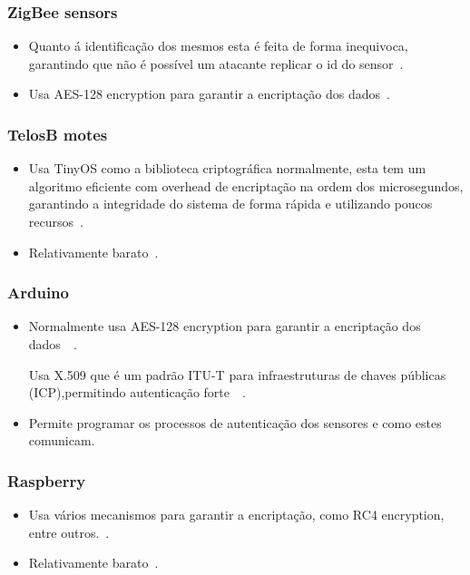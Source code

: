 \subsubsection{ZigBee sensors}
\begin{itemize}
\item Quanto á identificação dos mesmos esta é feita de forma inequivoca, garantindo que não é possível um atacante replicar o id do sensor~\cite{ref_url1}.\newline 
\item Usa AES-128 encryption para garantir a encriptação dos dados~\cite{ref_url1}.
\end{itemize}
\subsubsection{TelosB motes}
\begin{itemize}
\item Usa TinyOS como a biblioteca criptográfica normalmente, esta tem um algoritmo eficiente com overhead de encriptação na ordem dos microsegundos, garantindo a integridade do sistema de forma rápida e utilizando poucos recursos~\cite{ref_url2}.\newline
\item Relativamente barato~\cite{ref_url2}.
\end{itemize}
\subsubsection{Arduino}
\begin{itemize}
\item Normalmente usa AES-128 encryption para garantir a encriptação dos dados~\cite{ref_url3.1}~\cite{ref_url3.2}.\newline
\par Usa X.509 que é um padrão ITU-T para infraestruturas de chaves públicas (ICP),permitindo autenticação forte~\cite{ref_url3.3}~\cite{ref_url3.4}.
\item Permite programar os processos de autenticação dos sensores e como estes comunicam. 
\end{itemize}
\subsubsection{Raspberry}
\begin{itemize}
\item Usa vários mecanismos para garantir a encriptação, como RC4 encryption,  entre outros.~\cite{ref_url4.1}.
\item Relativamente barato~\cite{ref_url4.1}.\newline
\end{itemize}

